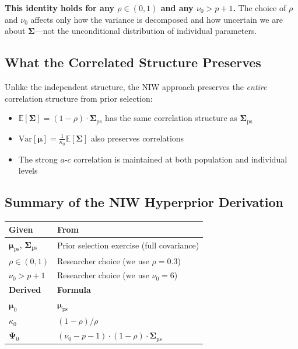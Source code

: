 \documentclass[11pt]{article}
\newcommand{\E}{\mathbb{E}}
\newcommand{\Var}{\text{Var}}
\begin{document}
\textbf{This identity holds for any $\rho \in (0, 1)$ and any $\nu_0 > p + 1$.} The choice of $\rho$ and $\nu_0$ affects only how the variance is decomposed and how uncertain we are about $\boldsymbol{\Sigma}$---not the unconditional distribution of individual parameters.

\subsection{What the Correlated Structure Preserves}

Unlike the independent structure, the NIW approach preserves the \textit{entire} correlation structure from prior selection:
\begin{itemize}
  \item $\E[\boldsymbol{\Sigma}] = (1-\rho) \cdot \boldsymbol{\Sigma}_{\text{ps}}$ has the same correlation structure as $\boldsymbol{\Sigma}_{\text{ps}}$
  \item $\Var[\boldsymbol{\mu}] = \frac{1}{\kappa_0} \E[\boldsymbol{\Sigma}]$ also preserves correlations
  \item The strong $a$-$c$ correlation is maintained at both population and individual levels
\end{itemize}

\subsection{Summary of the NIW Hyperprior Derivation}

\begin{center}
\begin{tabular}{ll}
\toprule
\textbf{Given} & \textbf{From} \\
\midrule
$\boldsymbol{\mu}_{\text{ps}}$, $\boldsymbol{\Sigma}_{\text{ps}}$ & Prior selection exercise (full covariance) \\
$\rho \in (0, 1)$ & Researcher choice (we use $\rho = 0.3$) \\
$\nu_0 > p + 1$ & Researcher choice (we use $\nu_0 = 6$) \\
\midrule
\textbf{Derived} & \textbf{Formula} \\
\midrule
$\boldsymbol{\mu}_0$ & $\boldsymbol{\mu}_{\text{ps}}$ \\
$\kappa_0$ & $(1 - \rho) / \rho$ \\
$\boldsymbol{\Psi}_0$ & $(\nu_0 - p - 1) \cdot (1 - \rho) \cdot \boldsymbol{\Sigma}_{\text{ps}}$ \\
\bottomrule
\end{tabular}
\end{center}
\end{document}
